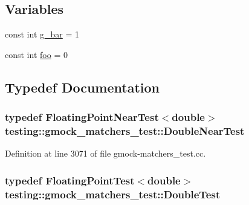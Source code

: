 \subsection*{Variables}
\begin{DoxyCompactItemize}
\item 
const int \hyperlink{namespacetesting_1_1gmock__matchers__test_a55dcc962203a3a3361d2e7e00ed99b4d}{g\+\_\+bar} = 1
\item 
const int \hyperlink{namespacetesting_1_1gmock__matchers__test_a3536e68112ffbb1f76887cd15bb45c15}{foo} = 0
\end{DoxyCompactItemize}


\subsection{Typedef Documentation}
\subsubsection[{\texorpdfstring{Double\+Near\+Test}{DoubleNearTest}}]{\setlength{\rightskip}{0pt plus 5cm}typedef {\bf Floating\+Point\+Near\+Test}$<$double$>$ {\bf testing\+::gmock\+\_\+matchers\+\_\+test\+::\+Double\+Near\+Test}}\hypertarget{namespacetesting_1_1gmock__matchers__test_aea537d0183ccc65b5c49a75d711993c8}{}\label{namespacetesting_1_1gmock__matchers__test_aea537d0183ccc65b5c49a75d711993c8}


Definition at line 3071 of file gmock-\/matchers\+\_\+test.\+cc.

\subsubsection[{\texorpdfstring{Double\+Test}{DoubleTest}}]{\setlength{\rightskip}{0pt plus 5cm}typedef {\bf Floating\+Point\+Test}$<$double$>$ {\bf testing\+::gmock\+\_\+matchers\+\_\+test\+::\+Double\+Test}}\hypertarget{namespacetesting_1_1gmock__matchers__test_a944cdd366ed240f29ae8e3ebc753ad5c}{}\label{namespacetesting_1_1gmock__matchers__test_a944cdd366ed240f29ae8e3ebc753ad5c}


